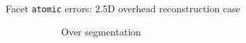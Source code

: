 \documentclass[10pt, export]{beamer}
\begin{document}
\begin{frame}{Facet \texttt{atomic} errors: 2.5D overhead reconstruction case}
{\begin{figure}
\begin{center}
\begin{subfigure}{.31\textwidth}
                                \caption{\label{fig::fac_over} Over segmentation}
                            \end{subfigure}
                            \begin{subfigure}{.37\textwidth}
                                \centering

\end{subfigure}
\end{center}
\end{figure}}
\end{frame}
\end{document}
